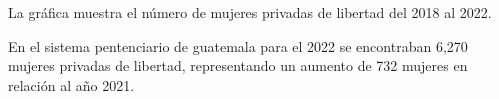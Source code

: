 La gráfica muestra el número de mujeres privadas de libertad del 2018 al 2022. 

En el sistema pentenciario de guatemala para el 2022 se encontraban 6,270 mujeres privadas de libertad, representando un aumento de 732 mujeres en relación al año 2021. 